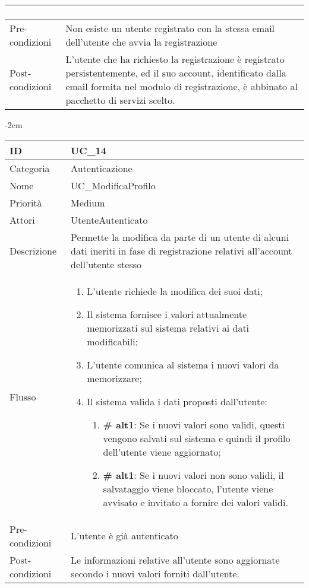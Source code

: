 \begin{center}
\begin{table}[bp]
\begin{tabular}{ |p{2.6cm}|p{13cm}|  }
\begin{enumerate}
\begin{enumerate}[  ]
			\end{enumerate}
		\end{enumerate}\\\hline
Pre-condizioni &  Non esiste un utente registrato con la stessa email dell'utente che avvia la registrazione\\\hline
Post-condizioni &  L'utente che ha richiesto la registrazione è registrato persistentemente, ed il suo account, identificato dalla email formita nel modulo di registrazione, è abbinato al pacchetto di servizi scelto.\\\hline
\end{tabular}
\label{table_use_case:13}\newline
\end{table}

\begin{table}[bp]
    \centering
    \addtolength{\leftskip} {-2cm}
\begin{tabular}{ |p{2.6cm}|p{13cm}|  }
\hline
ID & UC\_14\\\hline
Categoria & Autenticazione \\\hline
Nome & UC\_ModificaProfilo \\\hline
Priorità & Medium \\\hline
Attori &  UtenteAutenticato \\\hline
Descrizione & Permette la modifica da parte di un utente di alcuni dati ineriti in fase di registrazione relativi all'account dell'utente stesso  \\\hline
Flusso &  	\begin{enumerate}
			\item L'utente richiede la modifica dei suoi dati;
			\item Il sistema fornisce i valori attualmente memorizzati sul sistema relativi ai dati modificabili;
			\item L'utente comunica al sistema i nuovi valori da memorizzare;
			\item Il sistema valida i dati proposti dall'utente:
			\begin{enumerate}[  ]
				\item\textbf{\# alt1}: Se i nuovi valori sono validi, questi vengono salvati sul sistema e quindi il profilo dell'utente viene aggiornato;
				\item\textbf{\# alt1}: Se i nuovi valori non sono validi, il salvataggio viene bloccato, l'utente viene avvisato e invitato a fornire dei valori validi.
			\end{enumerate}
		\end{enumerate}\\\hline
Pre-condizioni &  L'utente è già autenticato\\\hline
Post-condizioni &  Le informazioni relative all'utente sono aggiornate secondo i nuovi valori forniti dall'utente.\\\hline
\end{tabular}
\label{table_use_case:14}\newline
\end{table}


\end{center}

